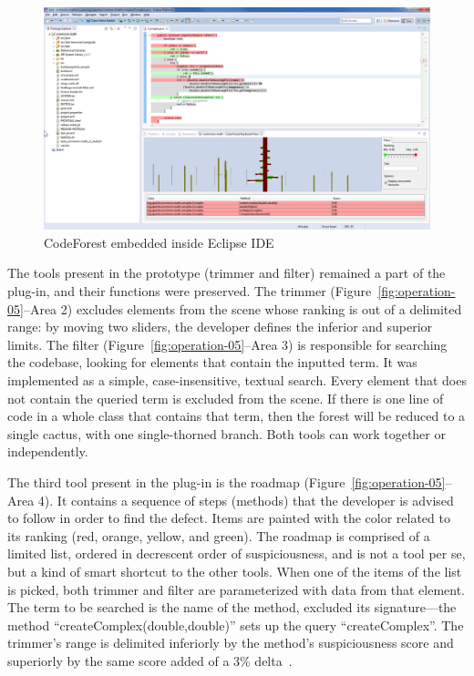 \begin{figure}[ht]
\centerline{\includegraphics[width=.8\linewidth]{figures/commons_math_complex_05_view_min}}
\caption{CodeForest embedded inside Eclipse IDE}\label{fig:operation-04}
\end{figure}

The tools present in the prototype (trimmer and filter) remained a part of the
plug-in, and their functions were preserved. The trimmer
(Figure~\ref{fig:operation-05}--Area 2) excludes elements from the scene whose
ranking is out of a delimited range: by moving two sliders, the developer
defines the inferior and superior limits. The filter
(Figure~\ref{fig:operation-05}--Area 3) is responsible for searching the
codebase, looking for elements that contain the inputted term. It was
implemented as a simple, case-insensitive, textual search. Every element  that
does not contain the queried term is excluded from the scene. If there is one
line of code in a whole class that contains that term, then the forest will be
reduced to a single cactus, with one single-thorned branch. Both tools can work
together or independently.

The third tool present in the plug-in is the roadmap
(Figure~\ref{fig:operation-05}--Area 4). It contains a sequence of steps
(methods) that the developer is advised to follow in order to find the defect.
Items are painted with the color related to its ranking (red, orange, yellow,
and green). The roadmap is comprised of a limited list, ordered in decrescent
order of suspiciousness, and is not a tool per se, but a kind of smart shortcut
to the other tools. When one of the items of the list is picked, both trimmer
and filter are parameterized with data from that element. The term to be
searched is the name of the method, excluded its signature---the method
``createComplex(double,double)'' sets up the query ``createComplex''. The
trimmer's range is delimited inferiorly by the method's suspiciousness score and
superiorly by the same score added of a 3\% delta~\cite{souza2012depuracao}.

